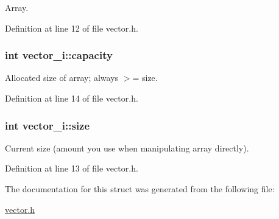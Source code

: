 Array. 



Definition at line 12 of file vector.h.

\hypertarget{structvector__i_af108aa670ac888975024a428c31f27fc}{
\subsubsection[{capacity}]{\setlength{\rightskip}{0pt plus 5cm}int {\bf vector\_\-i::capacity}}}
\label{structvector__i_af108aa670ac888975024a428c31f27fc}


Allocated size of array; always $>$= size. 



Definition at line 14 of file vector.h.

\hypertarget{structvector__i_a04afc9e861d169d920fc8d2a26b670cd}{
\subsubsection[{size}]{\setlength{\rightskip}{0pt plus 5cm}int {\bf vector\_\-i::size}}}
\label{structvector__i_a04afc9e861d169d920fc8d2a26b670cd}


Current size (amount you use when manipulating array directly). 



Definition at line 13 of file vector.h.



The documentation for this struct was generated from the following file:\begin{DoxyCompactItemize}
\item 
\hyperlink{vector_8h}{vector.h}\end{DoxyCompactItemize}
